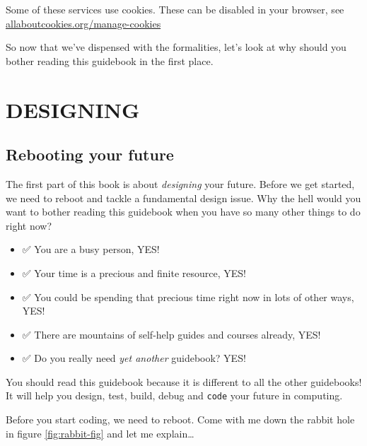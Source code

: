 \documentclass[
]{book}
\providecommand{\tightlist}{%
  \setlength{\itemsep}{0pt}\setlength{\parskip}{0pt}}
\begin{document}
Some of these services use cookies. These can be disabled in your browser, see \href{https://www.allaboutcookies.org/manage-cookies/}{allaboutcookies.org/manage-cookies}

So now that we've dispensed with the formalities, let's look at why should you bother reading this guidebook in the first place.















\hypertarget{part-designing}{%
\part{DESIGNING}\label{part-designing}}

\hypertarget{rebooting}{%
\chapter{Rebooting your future}\label{rebooting}}

The first part of this book is about \emph{designing} your future. Before we get started, we need to reboot and tackle a fundamental design issue. Why the hell would you want to bother reading this guidebook when you have so many other things to do right now?

\begin{itemize}
\tightlist
\item
  ✅ You are a busy person, YES!
\item
  ✅ Your time is a precious and finite resource, YES!
\item
  ✅ You could be spending that precious time right now in lots of other ways, YES!
\item
  ✅ There are mountains of self-help guides and courses already, YES!
\item
  ✅ Do you really need \emph{yet another} guidebook? YES!
\end{itemize}

You should read this guidebook because it is different to all the other guidebooks! It will help you design, test, build, debug and \texttt{code} your future in computing.

Before you start coding, we need to reboot. Come with me down the rabbit hole in figure \ref{fig:rabbit-fig} and let me explain\ldots{} 🐇
\end{document}
